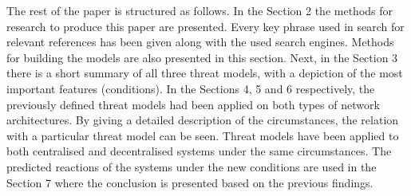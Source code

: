 The rest of the paper is structured as follows.
In the Section 2 the methods for research to produce this paper are presented.
Every key phrase used in search for relevant references has been given along with the used search engines.
Methods for building the models are also presented in this section.
Next, in the Section 3 there is a short summary of all three threat models, with a depiction of the most important features (conditions).
In the Sections 4, 5 and 6 respectively, the previously defined threat models had been applied on both types of network architectures.
By giving a detailed description of the circumstances, the relation with a particular threat model can be seen.
Threat models have been applied to both centralised and decentralised systems under the same circumstances.
The predicted reactions of the systems under the new conditions are used in the Section 7 where the conclusion is presented based on the previous findings.
